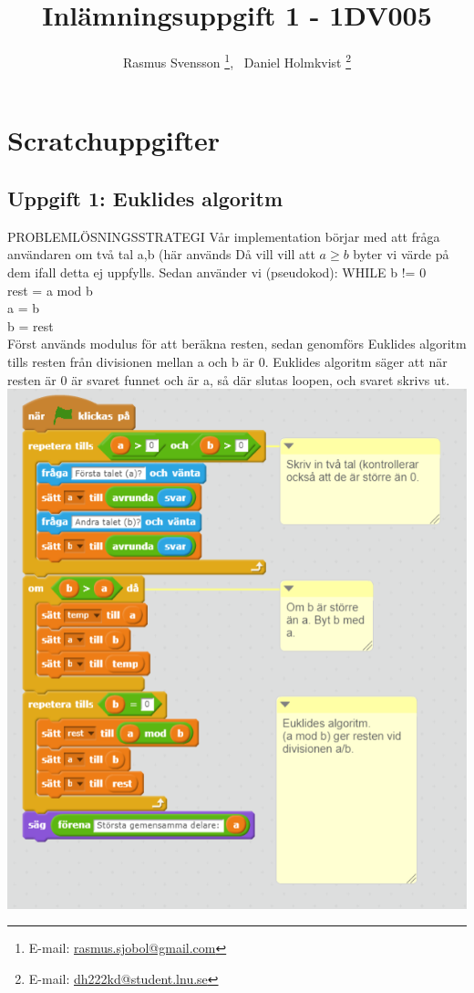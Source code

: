 \documentclass[12pt,a4paper]{article}
\begin{document}
\author{Rasmus Svensson%
  \thanks{E-mail: \href{mailto:rasmus.sjobol@gmail.com}{rasmus.sjobol@gmail.com}}, \ {Daniel Holmkvist%
  \thanks{E-mail: \href{mailto:dh222kd@student.lnu.se}{dh222kd@student.lnu.se}}}}
\title{Inlämningsuppgift 1 - 1DV005}
\maketitle
\tableofcontents
\newpage
\section{Scratchuppgifter}
\subsection{Uppgift 1: Euklides algoritm}
PROBLEMLÖSNINGSSTRATEGI 
Vår implementation börjar med att fråga användaren om två tal a,b (här används  Då vill vill att $ a \geq b$ byter vi värde på dem ifall detta ej uppfylls. Sedan använder vi (pseudokod): 
WHILE b != 0         \\
 	rest = a mod b \\
	a = b \\
	b = rest \\ 
	
Först används modulus för att beräkna resten, sedan genomförs Euklides algoritm tills resten från divisionen mellan a och b är 0. Euklides algoritm säger att när resten är 0 är svaret funnet och är a, så där slutas loopen, och svaret skrivs ut. \\

\includegraphics[scale=0.85]{euklidesimpl}
\end{document}
